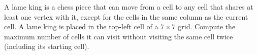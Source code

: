 A lame king is a chess piece that can move from a cell to any cell that shares at least one vertex with it, except for the cells in the same column as the current cell.
A lame king is placed in the top-left cell of a $7 \times 7$ grid. Compute the maximum number of cells it can visit without visiting the same cell twice (including its starting cell).